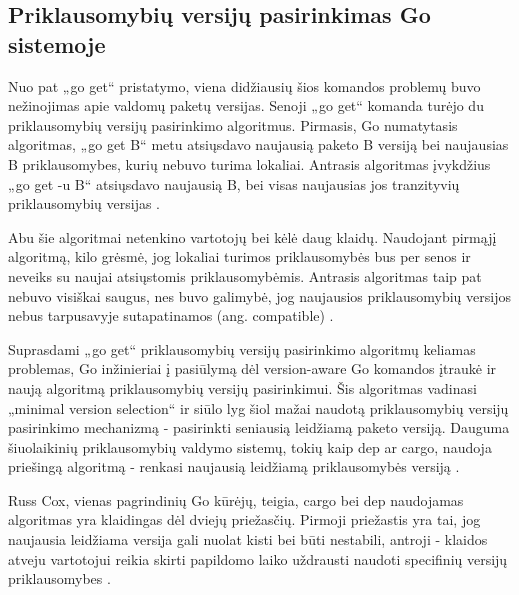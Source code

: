 \subsection{Priklausomybių versijų pasirinkimas Go sistemoje}

Nuo pat „go get“ pristatymo, viena didžiausių šios komandos problemų buvo
nežinojimas apie valdomų paketų versijas.
Senoji „go get“ komanda turėjo du priklausomybių versijų pasirinkimo algoritmus.
Pirmasis, Go numatytasis algoritmas, „go get B“ metu atsiųsdavo naujausią paketo B versiją
bei naujausias B priklausomybes, kurių nebuvo turima lokaliai. Antrasis algoritmas įvykdžius „go get -u B“
atsiųsdavo naujausią B, bei visas naujausias jos tranzityvių priklausomybių versijas \cite{COX18d}.

Abu šie algoritmai netenkino vartotojų bei kėlė daug klaidų. Naudojant pirmąjį algoritmą,
kilo grėsmė, jog lokaliai turimos priklausomybės bus per senos ir neveiks su naujai atsiųstomis
priklausomybėmis. Antrasis algoritmas taip pat nebuvo visiškai saugus, nes buvo galimybė,
jog naujausios priklausomybių versijos nebus tarpusavyje sutapatinamos (ang. compatible) \cite{COX18e}.


Suprasdami „go get“ priklausomybių versijų pasirinkimo algoritmų keliamas problemas,
Go inžinieriai į pasiūlymą dėl version-aware Go komandos įtraukė ir naują algoritmą priklausomybių
versijų pasirinkimui. Šis algoritmas vadinasi „minimal version selection“ ir siūlo lyg šiol mažai naudotą
priklausomybių versijų pasirinkimo mechanizmą - pasirinkti seniausią leidžiamą paketo versiją.
Dauguma šiuolaikinių priklausomybių valdymo sistemų, tokių kaip dep ar cargo, naudoja priešingą algoritmą -
renkasi naujausią leidžiamą priklausomybės versiją \cite{COX18a} \cite{COX18f}.

Russ Cox, vienas pagrindinių Go kūrėjų, teigia, cargo bei dep naudojamas algoritmas yra klaidingas
dėl dviejų priežasčių. Pirmoji priežastis yra tai, jog naujausia leidžiama versija gali nuolat kisti
bei būti nestabili, antroji - klaidos atveju vartotojui reikia skirti papildomo
laiko uždrausti naudoti specifinių versijų priklausomybes \cite{COX18a}.


